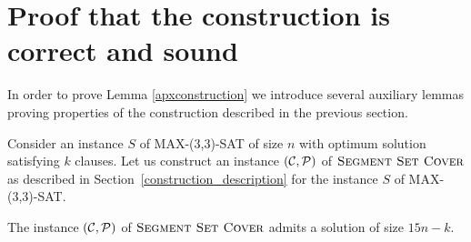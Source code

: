 \section{Proof that the construction is correct and sound}

In order to prove Lemma \ref{apxconstruction} we introduce several
auxiliary lemmas proving properties of the construction
described in the previous section.

Consider an instance $S$ of MAX-(3,3)-SAT of size $n$
with optimum solution satisfying $k$ clauses.
Let us construct an instance $(\mathcal{C}, \mathcal{P})$ of $\textsc{Segment Set Cover}$
as described in Section~\ref{construction_description}
for the instance $S$ of MAX-(3,3)-SAT.

\begin{lemma}
	\label{construction_correctness}
	The instance $(\mathcal{C}, \mathcal{P})$ of $\textsc{Segment Set Cover}$
	admits a solution of size $15n - k$.
\end{lemma}

